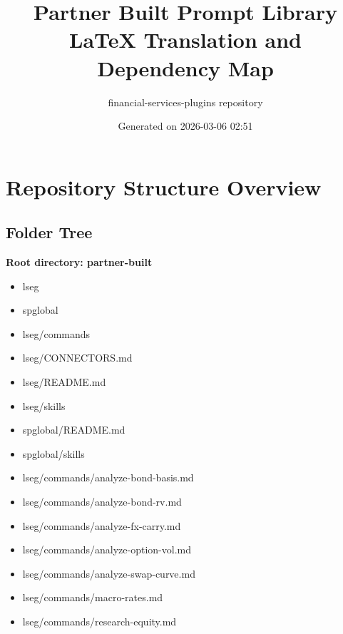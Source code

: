 \documentclass[11pt]{article}
\title{Partner Built Prompt Library\\LaTeX Translation and Dependency Map}
\author{financial-services-plugins repository}
\date{Generated on 2026-03-06 02:51 }
\begin{document}
\maketitle
\tableofcontents
\newpage

\section{Repository Structure Overview}

\subsection{Folder Tree}
\textbf{Root directory: partner-built}
\begin{itemize}[leftmargin=*,itemsep=1pt,topsep=2pt]
\item \hspace*{0.0em}lseg
\item \hspace*{0.0em}spglobal
\item \hspace*{0.9em}lseg/commands
\item \hspace*{0.9em}lseg/CONNECTORS.md
\item \hspace*{0.9em}lseg/README.md
\item \hspace*{0.9em}lseg/skills
\item \hspace*{0.9em}spglobal/README.md
\item \hspace*{0.9em}spglobal/skills
\item \hspace*{1.8em}lseg/commands/analyze-bond-basis.md
\item \hspace*{1.8em}lseg/commands/analyze-bond-rv.md
\item \hspace*{1.8em}lseg/commands/analyze-fx-carry.md
\item \hspace*{1.8em}lseg/commands/analyze-option-vol.md
\item \hspace*{1.8em}lseg/commands/analyze-swap-curve.md
\item \hspace*{1.8em}lseg/commands/macro-rates.md
\item \hspace*{1.8em}lseg/commands/research-equity.md

\end{itemize}
\end{document}
